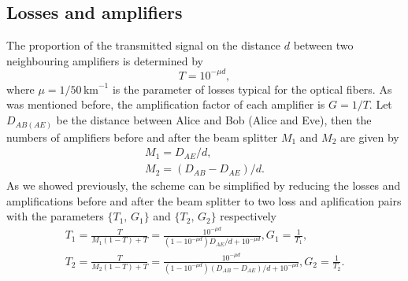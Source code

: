 \documentclass[a4paper]{article}
\newcommand{\be}{\begin{equation}}
\newcommand{\ee}{\end{equation}}
\begin{document}
\subsection{Losses and amplifiers}
The proportion of the transmitted signal on the distance $d$ between two neighbouring amplifiers is determined by
%
\begin{equation}
    T = 10^{-\mu d},
\end{equation}
%
where $\mu=1/50\,\text{km}^{-1}$ is the parameter of losses typical for the optical fibers.
As was mentioned before, the amplification factor of each amplifier is $G=1/T$.
Let $D_{AB(AE)}$ be the distance between Alice and Bob (Alice and Eve), then the numbers of amplifiers before and after the beam splitter $M_1$ and $M_2$ are given by
%
\begin{gather}
    M_1 = D_{AE}/d,\\
    M_2 = (D_{AB}-D_{AE})/d.
\end{gather}
As we showed previously, the scheme can be simplified by reducing the losses and amplifications before and after the beam splitter to two loss and aplification pairs with the parameters $\{T_1,\,G_1\}$ and $\{T_2,\,G_2\}$ respectively
\be
\begin{split}
    T_1 = \frac{T}{M_1(1-T)+T} = \frac{10^{-\mu d}}{(1-10^{-\mu d})D_{AE}/d+10^{-\mu d}}, G_1 = \frac{1}{T_1},\\
    T_2 = \frac{T}{M_2(1-T)+T} = \frac{10^{-\mu d}}{(1-10^{-\mu d})(D_{AB}-D_{AE})/d+10^{-\mu d}}, G_2 = \frac{1}{T_2}.
\end{split}
\ee
\end{document}
